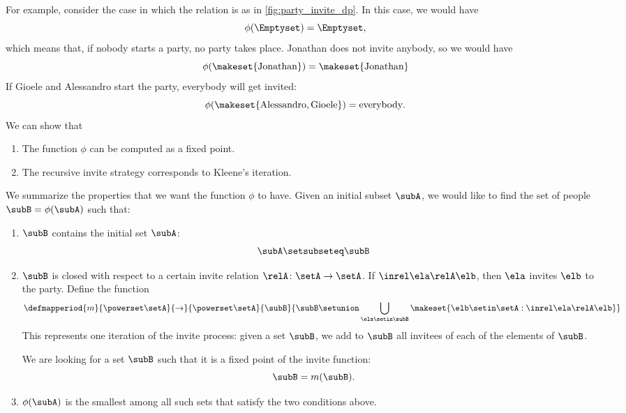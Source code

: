 For example, consider the case in which the relation is as in \cref{fig:party_invite_dp}.
In this case, we would have
\begin{equation}
    \phi(\Emptyset) = \Emptyset,
\end{equation}
which means that, if nobody starts a party, no party takes place.
Jonathan does not invite anybody, so we would have
\begin{equation}
    \phi(\makeset{\text{Jonathan}}) = \makeset{\text{Jonathan}}
\end{equation}
If Gioele and Alessandro start the party, everybody will get invited:
\begin{equation}
    \phi(\makeset{\text{Alessandro}, \text{Gioele}}) = \text{everybody}.
\end{equation}
%
We can show that
\begin{enumerate}
    \item The function $\phi$ can be computed as a fixed point.
    \item The recursive invite strategy corresponds to Kleene's iteration.
\end{enumerate}

We summarize the properties that we want the function $\phi$ to have.
Given an initial subset $\subA$, we would like to find the set of people $\subB = \phi(\subA)$ such that:
\begin{enumerate}
    \item $\subB$ contains the initial set $\subA$:
          \begin{equation}
              \label{eq:contains}
              \subA \setsubseteq \subB
          \end{equation}
    \item $\subB$ is closed with respect to a certain invite relation $\relA \colon \setA \to \setA$.
          If $\inrel \ela \relA \elb$, then $\ela$ invites $\elb$ to the party.
          Define the function
          \begin{equation}
              \defmapperiod{m}{\powerset \setA}{\to}{\powerset \setA
              }{
                  \subB
              }{
                  \subB \setunion \bigcup_{\ela \setin \subB} \makeset{ \elb \setin \setA : \inrel \ela \relA \elb}
              }
          \end{equation}
          This represents one iteration of the invite process: given a set $\subB$, we add to $\subB$ all invitees of each of the elements of $\subB$.

          We are looking for a set $\subB$ such that it is a fixed point of the invite function:
          \begin{equation}
              \subB = m(\subB).
          \end{equation}

    \item $\phi(\subA)$ is the smallest among all such sets that satisfy the two conditions above.
\end{enumerate}

